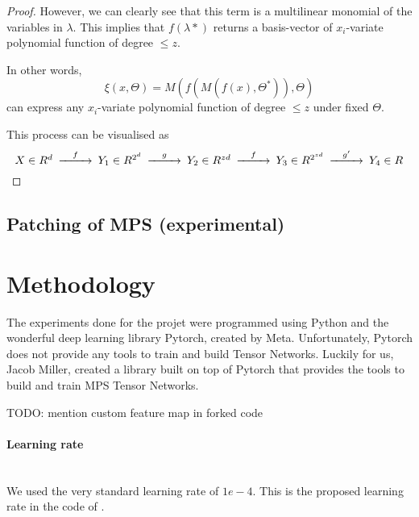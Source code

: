 \documentclass{article}
\theoremstyle{definition}
\theoremstyle{definition}
\begin{document}
\begin{proof}
However, we can clearly see that this term is a multilinear 
monomial of the variables in $\lambda$. This implies that
$f(\lambda*)$ returns a basis-vector of $x_i$-variate polynomial 
function of degree $\leq z$.

In other words, 
\begin{equation}
    \xi \left( x, \Theta \right) =
        M
        \left(
            f
            \left(
                M
                \left(
                    f
                    \left(
                        x 
                    \right),
                    \Theta^*
                \right)
            \right),
            \Theta
        \right)
\end{equation}
can express any $x_i$-variate polynomial function of degree $\leq z$ under
fixed $\Theta$.

This process can be visualised as 
\begin{equation} \label{composition_graph}
    \begin{CD}
        @. X \in R^d 
        @>f>> Y_1 \in R^{2^d}
        @>g>> Y_2 \in R^{zd} 
        @>f>> Y_3 \in R^{2^{zd}}
        @>g'>> Y_4 \in R
    \end{CD}
\end{equation}

\end{proof}

\subsection{Patching of MPS (experimental)}






\section{Methodology}
The experiments done for the projet were programmed using Python and the wonderful deep learning library Pytorch, created by Meta.
Unfortunately, Pytorch does not provide any tools to train and build Tensor Networks. 
Luckily for us, Jacob Miller, created a library \cite{torchmps} built on top of Pytorch that provides the tools to build and train MPS Tensor Networks. 

TODO: mention custom feature map in forked code

\paragraph{Learning rate} ${}$ \\
We used the very standard learning rate of $1e-4$. This is the proposed learning 
rate in the code of \cite{torchmps}.
\end{document}
